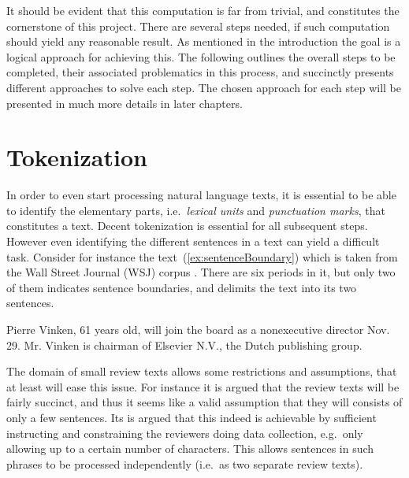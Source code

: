  It should be evident that this computation is far from trivial, and constitutes the cornerstone of this project. There are several steps needed, if such computation should yield any reasonable result. As mentioned in the introduction the goal is a logical approach for achieving this. The following outlines the overall steps to be completed, their associated problematics in this process, and succinctly presents different approaches to solve each step. The chosen approach for each step will be presented in much more details in later chapters. %

\section{Tokenization}
In order to even start processing natural language texts, it is essential to be able to identify the elementary parts, i.e.\ \emph{lexical units} and \emph{punctuation marks}, that constitutes a text. Decent tokenization is essential for all subsequent steps. However even identifying the different sentences in a text can yield a difficult task. Consider for instance the text~(\ref{ex:sentenceBoundary}) which is taken from the Wall Street Journal (WSJ) corpus \cite{wsjCorpus}. There are six periods in it, but only two of them indicates sentence boundaries, and delimits the text into its two sentences.

\begin{numquote}
  Pierre Vinken, 61 years old, will join the board as a nonexecutive director Nov. 29. Mr. Vinken is chairman of Elsevier N.V., the Dutch publishing group.  
  \label{ex:sentenceBoundary}
\end{numquote}

The domain of small review texts allows some restrictions and assumptions, that at least will ease this issue. For instance it is argued that the review texts will be fairly succinct, and thus it seems like a valid assumption that they will consists of only a few sentences. Its is argued that this indeed is achievable by sufficient instructing and constraining the reviewers doing data collection, e.g.\ only allowing up to a certain number of characters. This allows sentences in such phrases to be processed independently (i.e.\ as two separate review texts).

